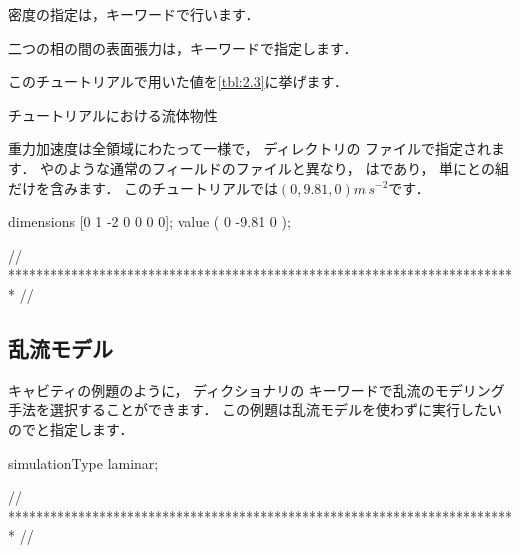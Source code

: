 密度の指定は，キーワードで行います．

二つの相の間の表面張力は，キーワードで指定します．

このチュートリアルで用いた値を\autoref{tbl:2.3}に挙げます．


\begin{table}
 
 \caption{チュートリアルにおける流体物性}
 \label{tbl:2.3}
\end{table}


重力加速度は全領域にわたって一様で，
ディレクトリの
%
%
ファイルで指定されます．
やのような通常のフィールドのファイルと異なり，
はであり，
単にとの組だけを含みます．
このチュートリアルでは$(0, 9.81, 0)\unit{m\,s^{-2}}$です．
\begin{OFverbatim}[file, linenum=17]

dimensions      [0 1 -2 0 0 0 0];
value           ( 0 -9.81 0 );


// ************************************************************************* //
\end{OFverbatim}


\subsection{乱流モデル}
\label{ssec:2.3.5@1.6}
キャビティの例題のように，
%
%
ディクショナリの
%
%
キーワードで乱流のモデリング手法を選択することができます．
この例題は乱流モデルを使わずに実行したいのでと指定します．
\begin{OFverbatim}[file, linenum=17]

simulationType  laminar;


// ************************************************************************* //
\end{OFverbatim}


